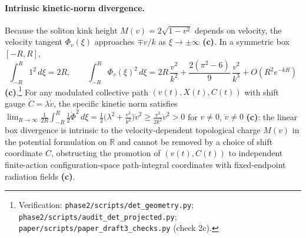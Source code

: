 \documentclass[11pt,a4paper]{article}
\newcommand{\lab}[1]{{\normalfont\sffamily\footnotesize\bfseries(#1)}}
\newcommand{\Lc}{\lab{c}}
\newcommand{\scr}[1]{\nolinkurl{#1}}
\newcommand{\chk}[1]{\footnote{\raggedright Verification: #1.}}
\theoremstyle{remark}
\begin{document}
\paragraph{Intrinsic kinetic-norm divergence.} Because the soliton kink height $M(v)=2\sqrt{1-v^2}$ depends on velocity, the velocity tangent $\Phi_v(\xi)$ approaches $\mp v/k$ as $\xi\to\pm\infty$ \Lc. In a symmetric box $[-R,R]$,
\begin{equation}\label{eq:boxnorm}
\int_{-R}^R 1^2\,d\xi=2R,\qquad
\int_{-R}^R\Phi_v(\xi)^2\,d\xi=2R\,\frac{v^2}{k^2}+\frac{2(\pi^2-6)}9\,\frac{v^2}{k^3}+O(R^2e^{-kR})
\end{equation}
\Lc.\chk{\scr{phase2/scripts/det_geometry.py}; \scr{phase2/scripts/audit_det_projected.py}; \scr{paper/scripts/paper_draft3_checks.py} (check 2c)}
For any modulated collective path $(v(t),X(t),C(t))$ with shift gauge $\dot C=\lambda\dot v$, the specific kinetic norm satisfies $\lim_{R\to\infty}\frac1{2R}\int_{-R}^R\tfrac12\dot\Phi^2\,d\xi=\tfrac12\big(\lambda^2+\frac{v^2}{k^2}\big)\dot v^2\ge\frac{v^2}{2k^2}\dot v^2>0$ for $v\neq0$, $\dot v\neq0$ \Lc: the linear box divergence is intrinsic to the velocity-dependent topological charge $M(v)$ in the potential formulation on $\mathbb R$ and cannot be removed by a choice of shift coordinate $C$, obstructing the promotion of $(v(t),C(t))$ to independent finite-action configuration-space path-integral coordinates with fixed-endpoint radiation fields \Lc.
\end{document}

